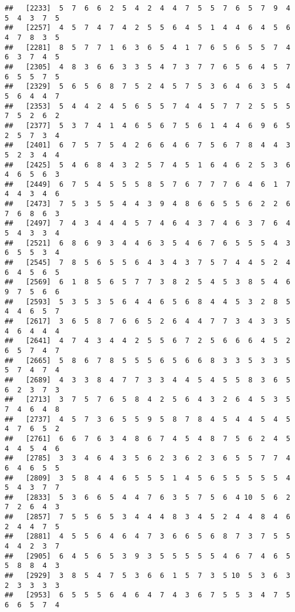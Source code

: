 \documentclass[
]{book}
\begin{document}
\begin{verbatim}
##   [2233]  5  7  6  6  2  5  4  2  4  4  7  5  5  7  6  5  7  9  4  5  4  3  7  5
##   [2257]  4  5  7  4  7  4  2  5  5  6  4  5  1  4  4  6  4  5  6  4  7  8  3  5
##   [2281]  8  5  7  7  1  6  3  6  5  4  1  7  6  5  6  5  5  7  4  6  3  7  4  5
##   [2305]  4  8  3  6  6  3  3  5  4  7  3  7  7  6  5  6  4  5  7  6  5  5  7  5
##   [2329]  5  6  5  6  8  7  5  2  4  5  7  5  3  6  4  6  3  5  4  5  6  4  4  7
##   [2353]  5  4  4  2  4  5  6  5  5  7  4  4  5  7  7  2  5  5  5  7  5  2  6  2
##   [2377]  5  3  7  4  1  4  6  5  6  7  5  6  1  4  4  6  9  6  5  2  5  7  3  4
##   [2401]  6  7  5  7  5  4  2  6  6  4  6  7  5  6  7  8  4  4  3  5  2  3  4  4
##   [2425]  5  4  6  8  4  3  2  5  7  4  5  1  6  4  6  2  5  3  6  4  6  5  6  3
##   [2449]  6  7  5  4  5  5  5  8  5  7  6  7  7  7  6  4  6  1  7  4  4  3  4  6
##   [2473]  7  5  3  5  5  4  4  3  9  4  8  6  6  5  5  6  2  2  6  7  6  8  6  3
##   [2497]  7  4  3  4  4  4  5  7  4  6  4  3  7  4  6  3  7  6  4  5  4  3  3  4
##   [2521]  6  8  6  9  3  4  4  6  3  5  4  6  7  6  5  5  5  4  3  6  5  5  3  4
##   [2545]  7  8  5  6  5  5  6  4  3  4  3  7  5  7  4  4  5  2  4  6  4  5  6  5
##   [2569]  6  1  8  5  6  5  7  7  3  8  2  5  4  5  3  8  5  4  6  9  7  5  6  6
##   [2593]  5  3  5  3  5  6  4  4  6  5  6  8  4  4  5  3  2  8  5  4  4  6  5  7
##   [2617]  3  6  5  8  7  6  6  5  2  6  4  4  7  7  3  4  3  3  5  4  6  4  4  4
##   [2641]  4  7  4  3  4  4  2  5  5  6  7  2  5  6  6  6  4  5  2  6  5  7  4  7
##   [2665]  5  8  6  7  8  5  5  5  6  5  6  6  8  3  3  5  3  3  5  5  7  4  7  4
##   [2689]  4  3  3  8  4  7  7  3  3  4  4  5  4  5  5  8  3  6  5  6  2  3  7  3
##   [2713]  3  7  5  7  6  5  8  4  2  5  6  4  3  2  6  4  5  3  5  7  4  6  4  8
##   [2737]  4  5  7  3  6  5  5  9  5  8  7  8  4  5  4  4  5  4  5  4  7  6  5  2
##   [2761]  6  6  7  6  3  4  8  6  7  4  5  4  8  7  5  6  2  4  5  4  4  5  4  6
##   [2785]  3  3  4  6  4  3  5  6  2  3  6  2  3  6  5  5  7  7  4  6  4  6  5  5
##   [2809]  3  5  8  4  4  6  5  5  5  1  4  5  6  5  5  5  5  5  4  5  4  3  7  7
##   [2833]  5  3  6  6  5  4  4  7  6  3  5  7  5  6  4 10  5  6  2  7  2  6  4  3
##   [2857]  7  5  5  6  5  3  4  4  4  8  3  4  5  2  4  4  8  4  6  2  4  4  7  5
##   [2881]  4  5  5  6  4  6  4  7  3  6  6  5  6  8  7  3  7  5  5  4  4  2  3  7
##   [2905]  6  4  5  6  5  3  9  3  5  5  5  5  5  4  6  7  4  6  5  5  8  8  4  3
##   [2929]  3  8  5  4  7  5  3  6  6  1  5  7  3  5 10  5  3  6  3  2  3  3  3  3
##   [2953]  6  5  5  5  6  4  6  4  7  4  3  6  7  5  5  3  4  7  5  6  6  5  7  4

\end{verbatim}
\end{document}
